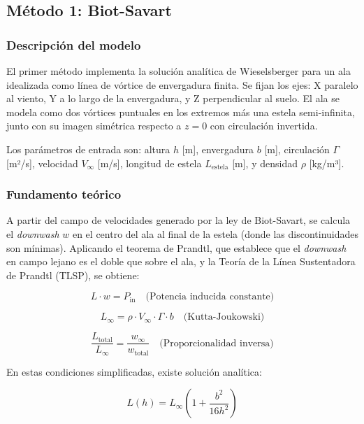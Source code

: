 \documentclass[twocolumn]{article}
\begin{document}
\subsection{Método 1: Biot-Savart}

\subsubsection{Descripción del modelo}
El primer método implementa la solución analítica de Wieselsberger para un ala idealizada como línea de vórtice de envergadura finita. Se fijan los ejes: X paralelo al viento, Y a lo largo de la envergadura, y Z perpendicular al suelo. El ala se modela como dos vórtices puntuales en los extremos más una estela semi-infinita, junto con su imagen simétrica respecto a $z = 0$ con circulación invertida.

Los parámetros de entrada son: altura $h$ [m], envergadura $b$ [m], circulación $\Gamma$ [m²/s], velocidad $V_\infty$ [m/s], longitud de estela $L_{\text{estela}}$ [m], y densidad $\rho$ [kg/m³].

\subsubsection{Fundamento teórico}
A partir del campo de velocidades generado por la ley de Biot-Savart, se calcula el \textit{downwash} $w$ en el centro del ala al final de la estela (donde las discontinuidades son mínimas). Aplicando el teorema de Prandtl, que establece que el \textit{downwash} en campo lejano es el doble que sobre el ala, y la Teoría de la Línea Sustentadora de Prandtl (TLSP), se obtiene:

\begin{equation}
    L \cdot w = P_{\text{in}} \quad \text{(Potencia inducida constante)}
\end{equation}

\begin{equation}
   L_{\infty} = \rho \cdot V_{\infty} \cdot \Gamma \cdot b \quad \text{(Kutta-Joukowski)}
\end{equation}

\begin{equation}
    \frac{L_{\text{total}}}{L_{\infty}} = \frac{w_{\infty}}{w_{\text{total}}} \quad \text{(Proporcionalidad inversa)}
\end{equation}

En estas condiciones simplificadas, existe solución analítica:

\begin{equation}
    L(h) = L_{\infty} \left( 1 + \frac{b^2}{16h^2} \right)
\end{equation}
\end{document}
